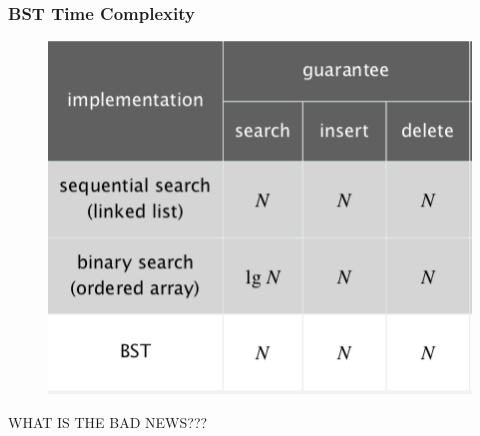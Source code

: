 \documentclass[11pt]{beamer}
\begin{document}
 \begin{frame}
 	\frametitle{BST Time Complexity} 
 	\begin{figure}
 			\centering
 			\includegraphics[width=0.7\linewidth]{"Screenshot 2020-11-16 at 10.36.22 PM"}
 			\caption{}
 			\label{fig:screenshot-2020-11-16-at-10}
 	\end{figure}	
 \end{frame}	

 \begin{frame}
 	\alert{WHAT IS THE BAD NEWS???}	
 \end{frame}	
  
\end{document}
